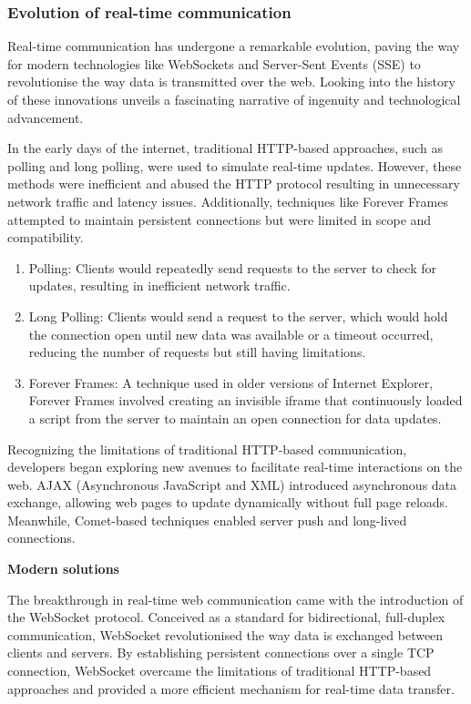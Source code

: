 \subsubsection{Evolution of real-time communication}

Real-time communication has undergone a remarkable evolution, paving the way for modern technologies like WebSockets and Server-Sent Events (SSE) to revolutionise the way data is transmitted over the web. Looking into the history of these innovations unveils a fascinating narrative of ingenuity and technological advancement.

In the early days of the internet, traditional HTTP-based approaches, such as polling and long polling, were used to simulate real-time updates. However, these methods were inefficient and abused the HTTP protocol resulting in unnecessary network traffic and latency issues. Additionally, techniques like Forever Frames attempted to maintain persistent connections but were limited in scope and compatibility. \cite{telerik-rtc}

\begin{enumerate}
  \item Polling: Clients would repeatedly send requests to the server to check for updates, resulting in inefficient network traffic.
  \item Long Polling: Clients would send a request to the server, which would hold the connection open until new data was available or a timeout occurred, reducing the number of requests but still having limitations.
  \item Forever Frames: A technique used in older versions of Internet Explorer, Forever Frames involved creating an invisible iframe that continuously loaded a script from the server to maintain an open connection for data updates.
\end{enumerate}

Recognizing the limitations of traditional HTTP-based communication, developers began exploring new avenues to facilitate real-time interactions on the web. AJAX (Asynchronous JavaScript and XML) introduced asynchronous data exchange, allowing web pages to update dynamically without full page reloads. Meanwhile, Comet-based techniques enabled server push and long-lived connections. \cite{alby-ws}

\textbf{Modern solutions}

The breakthrough in real-time web communication came with the introduction of the WebSocket protocol. Conceived as a standard for bidirectional, full-duplex communication, WebSocket revolutionised the way data is exchanged between clients and servers. By establishing persistent connections over a single TCP connection, WebSocket overcame the limitations of traditional HTTP-based approaches and provided a more efficient mechanism for real-time data transfer. \cite{alby-ws}

